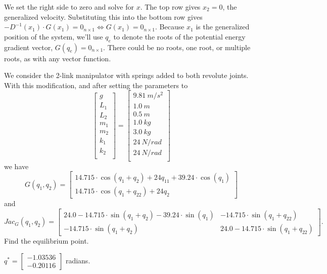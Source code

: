 \begin{enumerate}
    We set the right side to zero and solve for $x$. The top row gives $x_2=0$, the generalized velocity. Substituting this into the bottom row gives $-D^{-1}(x_1)\cdot G(x_1) = 0_{n \times 1} \iff G(x_1) = 0_{n \times 1} $. Because $x_1$ is the generalized position of the system, we'll use $q_e$ to denote the roots of the potential energy gradient vector, $G(q_e)=0_{n \times 1}$. There could be no roots, one root, or multiple roots, as with any vector function.
\end{enumerate} 
\Qed

  \bigskip

  \begin{example} We consider the 2-link manipulator with springs added to both revolute joints. With this modification, and after setting the parameters to
  $$
   \begin{bmatrix}
g \\
L_1 \\
L_2 \\
m_1 \\
m_2 \\
k_1 \\
k_2 \\
\end{bmatrix} = \begin{bmatrix}
9.81 ~m/s^2\\
1.0 ~m\\
0.5 ~m\\
1.0 ~kg\\
3.0 ~kg\\
24 ~N/rad\\
24 ~N/rad\\
\end{bmatrix}
$$  
  we have
  $$G(q_1, q_2) = \left[ \begin{array}{c} 14.715 \cdot \cos(q_1 + q_2) + 24 q_11 + 39.24 \cdot \cos(q_1) \\
 14.715 \cdot \cos(q_1 + q_22) + 24 q_2 \end{array} \right]$$
 and
 $$Jac_G(q_1, q_2) =
  \left[ \begin{array}{cc} 24.0 - 14.715 \cdot \sin(q_1 + q_2) - 39.24 \cdot \sin(q_1) & -14.715 \cdot \sin(q_1 + q_22) \\
  -14.715 \cdot \sin(q_1 + q_2) & 24.0 - 14.715 \cdot \sin(q_1 + q_22)
   \end{array} \right].
 $$
 Find the equilibrium point.      
  \end{example}
  \solution \Ans \quad $q^\ast = \left[ \begin{array}{c} -1.03536\\  -0.20116
\end{array} \right]$ radians. \\

